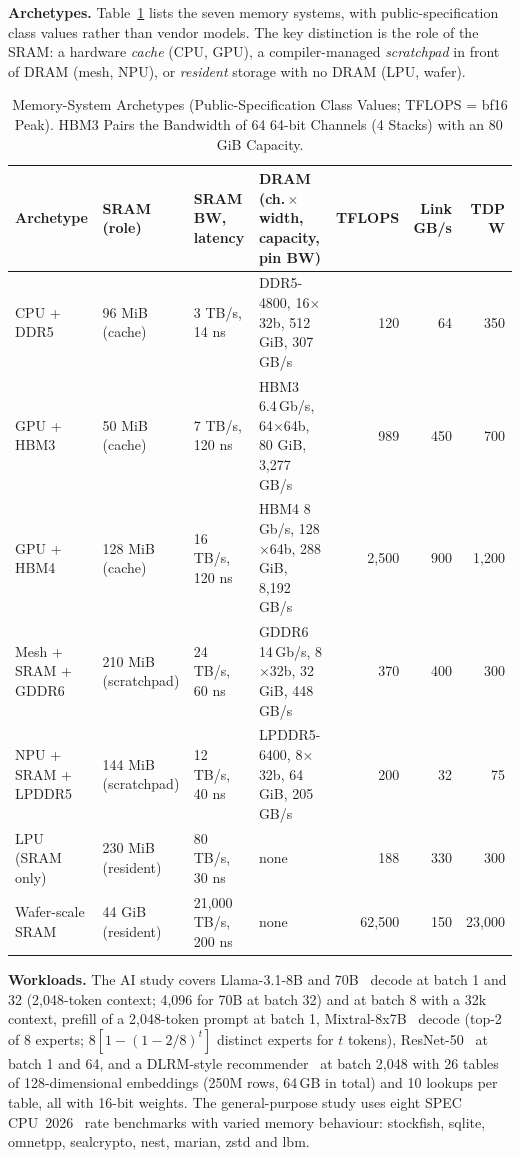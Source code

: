 \documentclass[conference]{IEEEtran}
\newcommand{\tmx}{\ensuremath{\times}}
\begin{document}
\textbf{Archetypes.} Table~\ref{tab:arch} lists the seven memory systems, with public-specification class values rather than vendor models. The key distinction is the role of the SRAM: a hardware \emph{cache} (CPU, GPU), a compiler-managed \emph{scratchpad} in front of DRAM (mesh, NPU), or \emph{resident} storage with no DRAM (LPU, wafer).

\begin{table}[t]
\caption{Memory-System Archetypes (Public-Specification Class Values; TFLOPS = bf16 Peak). HBM3 Pairs the Bandwidth of 64 64-bit Channels (4 Stacks) with an 80\,GiB Capacity.}
\label{tab:arch}
\centering
\scriptsize
\setlength{\tabcolsep}{2pt}
\begin{tabular}{@{}llllrrr@{}}
\toprule
Archetype & SRAM (role) & SRAM BW, latency & DRAM (ch.\,\tmx\,width, capacity, pin BW) & TFLOPS & Link GB/s & TDP W\\
\midrule
CPU + DDR5 & 96 MiB (cache) & 3 TB/s, 14 ns & DDR5-4800, 16\tmx32b, 512 GiB, 307 GB/s & 120 & 64 & 350\\
GPU + HBM3 & 50 MiB (cache) & 7 TB/s, 120 ns & HBM3 6.4\,Gb/s, 64\tmx64b, 80 GiB, 3,277 GB/s & 989 & 450 & 700\\
GPU + HBM4 & 128 MiB (cache) & 16 TB/s, 120 ns & HBM4 8\,Gb/s, 128\tmx64b, 288 GiB, 8,192 GB/s & 2,500 & 900 & 1,200\\
Mesh + SRAM + GDDR6 & 210 MiB (scratchpad) & 24 TB/s, 60 ns & GDDR6 14\,Gb/s, 8\tmx32b, 32 GiB, 448 GB/s & 370 & 400 & 300\\
NPU + SRAM + LPDDR5 & 144 MiB (scratchpad) & 12 TB/s, 40 ns & LPDDR5-6400, 8\tmx32b, 64 GiB, 205 GB/s & 200 & 32 & 75\\
LPU (SRAM only) & 230 MiB (resident) & 80 TB/s, 30 ns & none & 188 & 330 & 300\\
Wafer-scale SRAM & 44 GiB (resident) & 21,000 TB/s, 200 ns & none & 62,500 & 150 & 23,000\\
\bottomrule
\end{tabular}
\end{table}

\textbf{Workloads.} The AI study covers Llama-3.1-8B and 70B~\cite{llama3} decode at batch 1 and 32 (2,048-token context; 4,096 for 70B at batch 32) and at batch 8 with a 32k context, prefill of a 2,048-token prompt at batch 1, Mixtral-8x7B~\cite{jiang2024} decode (top-2 of 8 experts; $8[1-(1-2/8)^{t}]$ distinct experts for $t$ tokens), ResNet-50~\cite{he2016} at batch 1 and 64, and a DLRM-style recommender~\cite{naumov2019} at batch 2,048 with 26 tables of 128-dimensional embeddings (250M rows, 64\,GB in total) and 10 lookups per table, all with 16-bit weights. The general-purpose study uses eight SPEC CPU~2026~\cite{spec2026} rate benchmarks with varied memory behaviour: stockfish, sqlite, omnetpp, sealcrypto, nest, marian, zstd and lbm.
\end{document}
